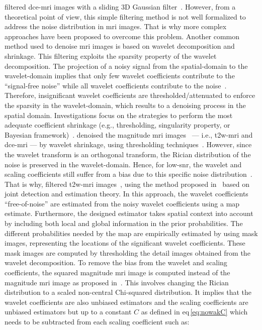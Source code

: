\citeauthor{samarasinghe2016semi} filtered \ac{dce}-\ac{mri} images with a sliding 3D Gaussian filter~\cite{samarasinghe2016semi}.
However, from a theoretical point of view, this simple filtering method is not well formalized to address the noise distribution in \ac{mri} images.
That is why more complex approaches have been proposed to overcome this problem.
Another common method used to denoise \ac{mri} images is based on wavelet decomposition and shrinkage.
This filtering exploits the sparsity property of the wavelet decomposition.
The projection of a noisy signal from the spatial-domain to the wavelet-domain implies that only few wavelet coefficients contribute to the ``signal-free noise'' while all wavelet coefficients contribute to the noise~\cite{Donoho1994}.
Therefore, insignificant wavelet coefficients are thresholded/attenuated to enforce the sparsity in the wavelet-domain, which results to a denoising process in the spatial domain.
Investigations focus on the strategies to perform the most adequate coefficient shrinkage (e.g., thresholding, singularity property, or Bayesian framework)~\cite{Pizurica2002}.
\citeauthor{Ampeliotis2008} denoised the magnitude \ac{mri} images~\cite{Ampeliotis2007,Ampeliotis2008} --- i.e., \ac{t2w}-\ac{mri} and \ac{dce}-\ac{mri} --- by wavelet shrinkage, using thresholding techniques~\cite{Mallat2008}.
However, since the wavelet transform is an orthogonal transform, the Rician distribution of the noise is preserved in the wavelet-domain.
Hence, for low-\ac{snr}, the wavelet and scaling coefficients still suffer from a bias due to this specific noise distribution~\cite{Nowak1999}.
That is why, \citeauthor{Lopes2011} filtered \ac{t2w}-\ac{mri} images~\cite{Lopes2011}, using the method proposed in~\cite{Pizurica2003} based on joint detection and estimation theory.
In this approach, the wavelet coefficients ``free-of-noise'' are estimated from the noisy wavelet coefficients using a \ac{map} estimate.
Furthermore, the designed estimator takes spatial context into account by including both local and global information in the prior probabilities.
The different probabilities needed by the \ac{map} are empirically estimated by using mask images, representing the locations of the significant wavelet coefficients.
These mask images are computed by thresholding the detail images obtained from the wavelet decomposition.
To remove the bias from the wavelet and scaling coefficients, the squared magnitude \ac{mri} image is computed instead of the magnitude \ac{mri} image as proposed in~\cite{Nowak1999}.
This involves changing the Rician distribution to a scaled non-central Chi-squared distribution.
It implies that the wavelet coefficients are also unbiased estimators and the scaling coefficients are unbiased estimators but up to a constant $C$ as defined in \acs{eq}\,\eqref{eq:nowakC} which needs to be subtracted from each scaling coefficient such as:

